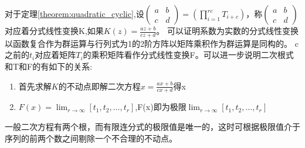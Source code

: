 \begin{remark}
对于定理\ref{theorem:quadratic_cyclic},设$\left(\begin{matrix}a&b\\c&d\end{matrix}\right)=(\prod_{i=1}^{rc} T_{i+c})$，称$\left(\begin{matrix}a&b\\c&d\end{matrix}\right)$对应着分式线性变换K,如果$K(z)=\frac{az+b}{cz+d}$。
可以证明系数为实数的分式线性变换以函数复合作为群运算与行列式为1的2阶方阵以矩阵乘积作为群运算是同构的。
c之前的$t_i$对应着矩阵$T_i$的乘积矩阵看作分式线性变换F。可以进一步说明二次根式和T和F的有如下的关系:
\begin{enumerate}
  \item 首先求解$K$的不动点即解二次方程$x=\frac{ax+b}{cx+d}$得x
  \item $F(x)=\lim_{r\to \infty}[t_1,t_2,\dots,t_r]$,F(x)即为极限$\lim_{r\to \infty}[t_1,t_2,\dots,t_r]$
\end{enumerate}
一般二次方程有两个根，而有限连分式的极限值是唯一的，这时可根据极限值介于序列的前两个数之间剔除一个不合理的不动点。
\end{remark}
